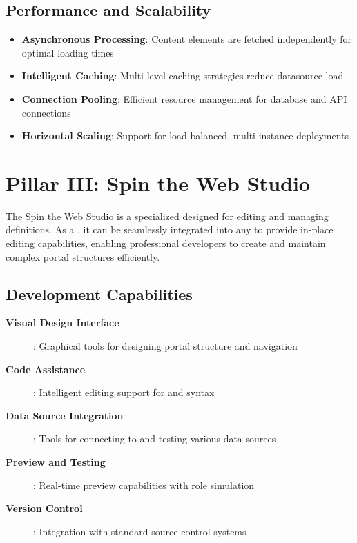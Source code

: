 \subsection{Performance and Scalability}

\begin{itemize}
	\item \textbf{Asynchronous Processing}: Content elements are fetched independently for optimal loading times
	\item \textbf{Intelligent Caching}: Multi-level caching strategies reduce datasource load
	\item \textbf{Connection Pooling}: Efficient resource management for database and API connections
	\item \textbf{Horizontal Scaling}: Support for load-balanced, multi-instance deployments
\end{itemize}

\section{Pillar III: Spin the Web Studio}
\label{sec:pillar-studio}

The Spin the Web Studio is a specialized \webbaselet{} designed for editing and managing \webbase{} definitions. As a \webbaselet{}, it can be seamlessly integrated into any \webbase{} to provide in-place editing capabilities, enabling professional developers to create and maintain complex portal structures efficiently.

\subsection{Development Capabilities}

\begin{description}
\item[\textbf{Visual Design Interface}]: Graphical tools for designing portal structure and navigation
\item[\textbf{Code Assistance}]: Intelligent editing support for \wbdl{} and \wbpl{} syntax
\item[\textbf{Data Source Integration}]: Tools for connecting to and testing various data sources
\item[\textbf{Preview and Testing}]: Real-time preview capabilities with role simulation
\item[\textbf{Version Control}]: Integration with standard source control systems
\end{description}

